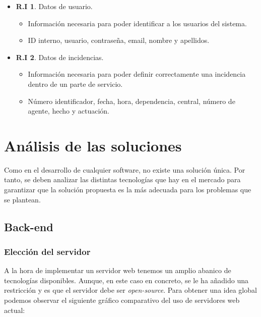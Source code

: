 \begin{itemize}
	\item \textbf{R.I 1}. Datos de usuario.
	\begin{itemize}
		\item Información necesaria para poder identificar a los usuarios del sistema.
		\item ID interno, usuario, contraseña, email, nombre y apellidos.
	\end{itemize}

	\item \textbf{R.I 2}. Datos de incidencias.
	\begin{itemize}
		\item Información necesaria para poder definir correctamente una incidencia dentro de un parte de servicio.
		\item Número identificador, fecha, hora, dependencia, central, número de agente, hecho y actuación.
	\end{itemize}
\end{itemize}

\section{Análisis de las soluciones}

Como en el desarrollo de cualquier software, no existe una solución única. Por tanto, se deben analizar las
distintas tecnologías que hay en el mercado para garantizar que la solución propuesta es la más adecuada para
los problemas que se plantean.\\

\subsection{Back-end}

\subsubsection{Elección del servidor} 
A la hora de implementar un servidor web tenemos un amplio abanico de tecnologías disponibles. Aunque, en este caso
en concreto, se le ha añadido una restricción y es que el servidor debe ser \textit{open-source}. Para obtener
una idea global podemos observar el siguiente gráfico comparativo del uso de servidores web actual:

